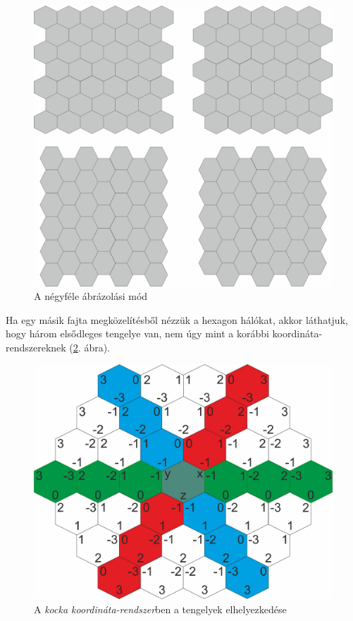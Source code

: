 \begin{figure}[h!]
\centering
\includegraphics[scale=0.2]{kepek/OffsetFour.jpg}
\caption{A négyféle ábrázolási mód}
\label{fig:OffsetFour}
\end{figure}

\newpage
{}

Ha egy másik fajta megközelítésből nézzük a hexagon hálókat, akkor láthatjuk, hogy három elsődleges tengelye van, nem úgy mint a korábbi koordináta-rendszereknek (\ref{fig:CubeCoord}. ábra).

\begin{figure}[h!]
\centering
\includegraphics[scale=0.4]{kepek/CubeCoord.jpg}
\caption{A \textit{kocka koordináta-rendszer}ben a tengelyek elhelyezkedése}
\label{fig:CubeCoord}
\end{figure}

